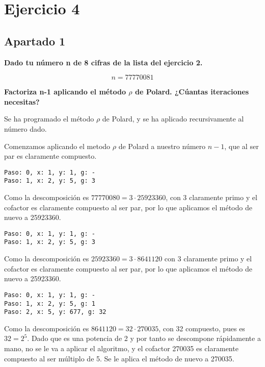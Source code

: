 \documentclass[a4paper]{article}
\title {\fbox{\Huge{\textbf{Ejercicio 4}}}}
\author {\fbox{Ana Buendía Ruiz-Azuaga}}
\begin{document}
\maketitle


\section{Ejercicio 4}
\subsection{Apartado 1}
\textbf{Dado tu número n de 8 cifras de la lista del ejercicio 2.}

$$n = 77770081$$

\textbf{Factoriza n-1 aplicando el método $\rho$ de Polard. ¿Cúantas iteraciones necesitas?}

Se ha programado el método $\rho$ de Polard, y se ha aplicado recursivamente al número dado.

Comenzamos aplicando el metodo $\rho$ de Polard a nuestro número $n-1$, que al ser par es claramente compuesto.

\begin{verbatim}
Paso: 0, x: 1, y: 1, g: -
Paso: 1, x: 2, y: 5, g: 3
\end{verbatim}

Como la descomposición es $77770080=3\cdot 25923360$, con 3 claramente primo y el cofactor es claramente compuesto al ser par, por lo que aplicamos el método de nuevo a 25923360.

\begin{verbatim}
Paso: 0, x: 1, y: 1, g: -
Paso: 1, x: 2, y: 5, g: 3
\end{verbatim}

Como la descomposición es $25923360=3\cdot 8641120$ con 3 claramente primo y el cofactor es claramente compuesto al ser par, por lo que aplicamos el método de nuevo a 25923360.

\begin{verbatim}
Paso: 0, x: 1, y: 1, g: -
Paso: 1, x: 2, y: 5, g: 1
Paso: 2, x: 5, y: 677, g: 32
\end{verbatim}

Como la descomposición es $8641120=32\cdot 270035$, con 32 compuesto, pues es $32=2^5$. Dado que es una potencia de 2 y por tanto se descompone rápidamente a mano, no se le va a aplicar el algoritmo, y el cofactor 270035 es claramente compuesto al ser múltiplo de 5. Se le aplica el método de nuevo a 270035.
\end{document}
